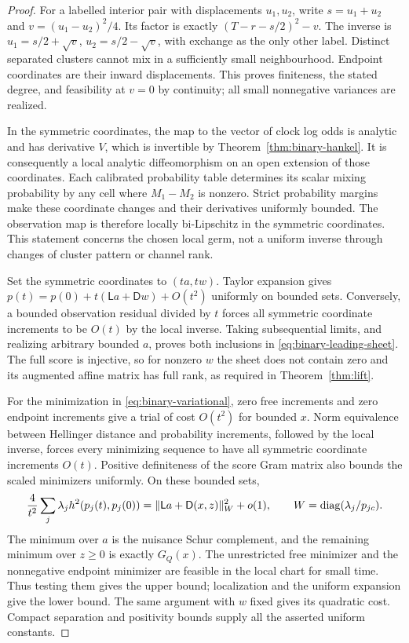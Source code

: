 \begin{proof}
For a labelled interior pair with displacements $u_1,u_2$, write
$s=u_1+u_2$ and $v=(u_1-u_2)^2/4$. Its factor is exactly
$(T-r-s/2)^2-v$. The inverse is
$u_1=s/2+\sqrt v$, $u_2=s/2-\sqrt v$, with exchange as the only other
label. Distinct separated clusters cannot mix in a sufficiently small
neighbourhood. Endpoint coordinates are their inward displacements.
This proves finiteness, the stated degree, and feasibility at $v=0$ by
continuity; all small nonnegative variances are realized.

In the symmetric coordinates, the map to the vector of clock log odds
is analytic and has derivative $V$, which is invertible by
Theorem~\ref{thm:binary-hankel}. It is consequently a local analytic
diffeomorphism on an open extension of those coordinates. Each calibrated
probability table determines its scalar mixing probability by any cell
where $M_1-M_2$ is nonzero. Strict probability margins make these
coordinate changes and their derivatives uniformly bounded. The
observation map is therefore locally bi-Lipschitz in the symmetric
coordinates. This statement concerns the chosen local germ, not a
uniform inverse through changes of cluster pattern or channel rank.

Set the symmetric coordinates to $(t a,t w)$. Taylor expansion gives
$p(t)=p(0)+t(\mathsf La+\mathsf Dw)+O(t^2)$ uniformly on bounded sets.
Conversely, a bounded observation residual divided by $t$ forces all
symmetric coordinate increments to be $O(t)$ by the local inverse.
Taking subsequential limits, and realizing arbitrary bounded $a$, proves
both inclusions in \eqref{eq:binary-leading-sheet}. The full score is
injective, so for nonzero $w$ the sheet does not contain zero and its
augmented affine matrix has full rank, as required in
Theorem~\ref{thm:lift}.

For the minimization in \eqref{eq:binary-variational}, zero free increments
and zero endpoint increments give a trial of cost $O(t^2)$ for bounded
$x$. Norm equivalence between Hellinger distance and probability
increments, followed by the local inverse, forces every minimizing
sequence to have all symmetric coordinate increments $O(t)$. Positive
definiteness of the score Gram matrix also bounds the scaled minimizers
uniformly. On these bounded sets,
\[
 \frac4{t^2}\sum_j\lambda_j h^2(p_j(t),p_j(0))
 =\|\mathsf La+\mathsf D(x,z)\|_W^2+o(1),
 \qquad W=\operatorname{diag}(\lambda_j/p_{jc}).
\]
The minimum over $a$ is the nuisance Schur complement, and the remaining
minimum over $z\ge0$ is exactly $G_Q(x)$. The unrestricted free minimizer
and the nonnegative endpoint minimizer are feasible in the local chart
for small time. Thus testing them gives the upper bound; localization
and the uniform expansion give the lower bound. The same argument with
$w$ fixed gives its quadratic cost. Compact separation and positivity
bounds supply all the asserted uniform constants.
\end{proof}

